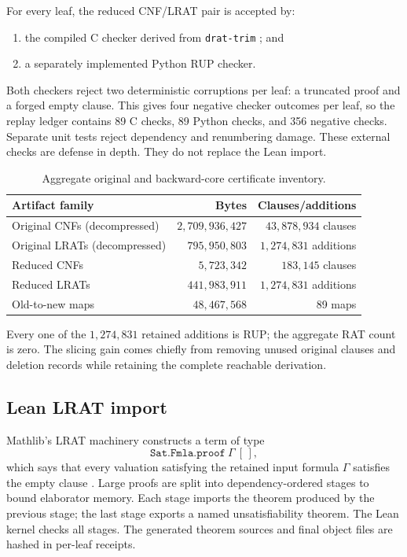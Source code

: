 \documentclass[11pt,reqno,a4paper]{amsart}
\theoremstyle{definition}
\theoremstyle{remark}
\newcommand{\code}[1]{\texttt{#1}}
\begin{document}
For every leaf, the reduced CNF/LRAT pair is accepted by:
\begin{enumerate}[leftmargin=2.2em]
\item the compiled C checker derived from \code{drat-trim}
      \cite{WetzlerHeuleHunt2014}; and
\item a separately implemented Python RUP checker.
\end{enumerate}
Both checkers reject two deterministic corruptions per leaf: a truncated
proof and a forged empty clause.  This gives four negative checker outcomes
per leaf, so the replay ledger contains 89 C checks, 89 Python checks, and 356
negative checks.  Separate unit tests reject dependency and renumbering
damage.  These external checks are defense in depth.  They do not replace the
Lean import.

\begin{table}[ht]
\centering
\caption{Aggregate original and backward-core certificate inventory.}
\label{tab:cores}
\begin{tabular}{@{}lrr@{}}
\toprule
Artifact family & Bytes & Clauses/additions\\
\midrule
Original CNFs (decompressed)
  & \(2{,}709{,}936{,}427\) & \(43{,}878{,}934\) clauses\\
Original LRATs (decompressed)
  & \(795{,}950{,}803\) & \(1{,}274{,}831\) additions\\
Reduced CNFs
  & \(5{,}723{,}342\) & \(183{,}145\) clauses\\
Reduced LRATs
  & \(441{,}983{,}911\) & \(1{,}274{,}831\) additions\\
Old-to-new maps
  & \(48{,}467{,}568\) & 89 maps\\
\bottomrule
\end{tabular}
\end{table}
Every one of the \(1{,}274{,}831\) retained additions is RUP; the aggregate
RAT count is zero.  The slicing gain comes chiefly from removing unused
original clauses and deletion records while retaining the complete reachable
derivation.

\subsection{Lean LRAT import}

Mathlib's LRAT machinery constructs a term of type
\[
  \code{Sat.Fmla.proof}\ \Gamma\ [\,],
\]
which says that every valuation satisfying the retained input formula
\(\Gamma\) satisfies the empty clause \cite{CruzFilipeEtAl2017,mathlib2020}.
Large proofs are split into dependency-ordered stages to bound elaborator
memory.  Each stage imports the theorem produced by the previous stage; the
last stage exports a named unsatisfiability theorem.  The Lean kernel checks
all stages.  The generated theorem sources and final object files are hashed
in per-leaf receipts.
\end{document}
